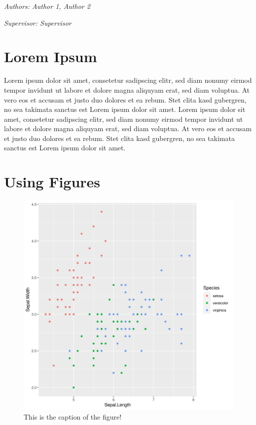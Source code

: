 \documentclass[
]{krantz}
\begin{document}
\emph{Authors: Author 1, Author 2}

\emph{Supervisor: Supervisor}

\hypertarget{lorem-ipsum}{%
\section{Lorem Ipsum}\label{lorem-ipsum}}

Lorem ipsum dolor sit amet, consetetur sadipscing elitr, sed diam nonumy eirmod tempor invidunt ut labore et dolore magna aliquyam erat, sed diam voluptua. At vero eos et accusam et justo duo dolores et ea rebum. Stet clita kasd gubergren, no sea takimata sanctus est Lorem ipsum dolor sit amet. Lorem ipsum dolor sit amet, consetetur sadipscing elitr, sed diam nonumy eirmod tempor invidunt ut labore et dolore magna aliquyam erat, sed diam voluptua. At vero eos et accusam et justo duo dolores et ea rebum. Stet clita kasd gubergren, no sea takimata sanctus est Lorem ipsum dolor sit amet.

\citet{rlang}

\hypertarget{using-figures}{%
\section{Using Figures}\label{using-figures}}

\begin{figure}

{\centering \includegraphics[width=0.8\linewidth]{figures/01-chapter1/ch01-figure01} 

}

\caption{This is the caption of the figure!}\label{fig:ch01-figure01-old}
\end{figure}
\end{document}
